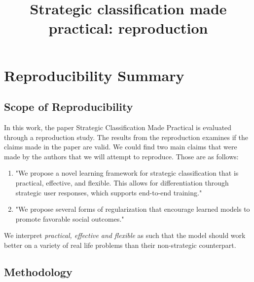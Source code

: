 \title{Strategic classification made practical: reproduction}

%

\author{}


\section*{\centering Reproducibility Summary}


\subsection*{Scope of Reproducibility}

In this work, the paper Strategic Classification Made Practical\cite{levanon2021strategic} is evaluated through a reproduction study. The results from the reproduction examines if the claims made in the paper are valid. We could find two main claims that were made by the authors that we will attempt to reproduce. Those are as follows:

\begin{enumerate}
    \item "We propose a novel learning framework for strategic classification that is practical, effective, and flexible. This allows for differentiation through strategic user responses, which supports end-to-end training."
    \item "We propose several forms of regularization that encourage learned models to promote favorable social outcomes."
\end{enumerate}

We interpret \textit{practical, effective and flexible} as such that the model should work better on a variety of real life problems than their non-strategic counterpart.

\subsection*{Methodology}

